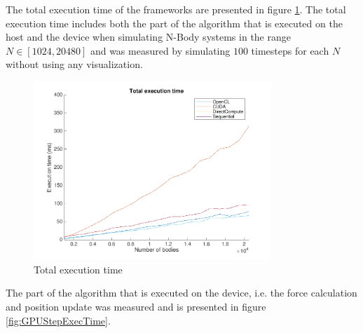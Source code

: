 %

The total execution time of the frameworks are presented in figure \ref{fig:GraphTotExecTime}. The total execution time includes both the part of the algorithm that is executed on the host and the device when simulating N-Body systems in the range $N \in [1024, 20480]$ and was measured by simulating $100$ timesteps for each $N$ without using any visualization. 

\begin{figure}[H]
    \centering
    \includegraphics[width=0.8\textwidth]{Results/Figs/TotalExecutionTime.png}
    \caption{Total execution time}
    \label{fig:GraphTotExecTime}
\end{figure}

The part of the algorithm that is executed on the device, i.e. the force calculation and position update was measured and is presented in figure \ref{fig:GPUStepExecTime}.

